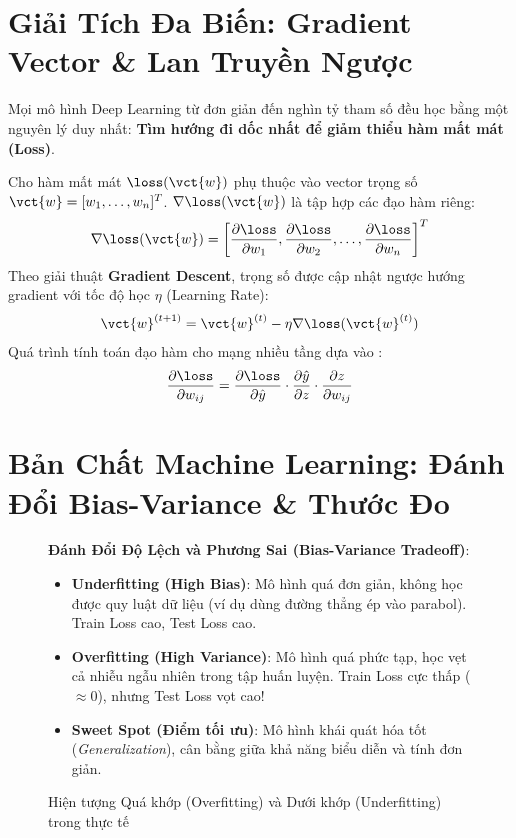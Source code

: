 \section{Giải Tích Đa Biến: Gradient Vector \& Lan Truyền Ngược}
\label{sec:math-calculus}

Mọi mô hình Deep Learning từ đơn giản đến nghìn tỷ tham số đều học bằng một nguyên lý duy nhất: \textbf{Tìm hướng đi dốc nhất để giảm thiểu hàm mất mát (Loss)}.

\begin{definitionbox}
Cho hàm mất mát $\loss(\vct{w})$ phụ thuộc vào vector trọng số $\vct{w} = [w_1, \dots, w_n]^T$.  $\nabla \loss(\vct{w})$ là tập hợp các đạo hàm riêng:
\[
\nabla \loss(\vct{w}) = \left[ \frac{\partial \loss}{\partial w_1}, \frac{\partial \loss}{\partial w_2}, \dots, \frac{\partial \loss}{\partial w_n} \right]^T
\]
Theo giải thuật \textbf{Gradient Descent}, trọng số được cập nhật ngược hướng gradient với tốc độ học $\eta$ (Learning Rate):
\[
\vct{w}^{(t+1)} = \vct{w}^{(t)} - \eta \nabla \loss(\vct{w}^{(t)})
\]
Quá trình tính toán đạo hàm cho mạng nhiều tầng dựa vào :
\[
\frac{\partial \loss}{\partial w_{ij}} = \frac{\partial \loss}{\partial \hat{y}} \cdot \frac{\partial \hat{y}}{\partial z} \cdot \frac{\partial z}{\partial w_{ij}}
\]
\end{definitionbox}

\section{Bản Chất Machine Learning: Đánh Đổi Bias-Variance \& Thước Đo}
\label{sec:ml-core}

\begin{figure}[htbp]
\centering
\begin{tcolorbox}[colback=boxbg,colframe=primarycolor,width=0.95\textwidth,arc=2pt]
\small
\textbf{Đánh Đổi Độ Lệch và Phương Sai (Bias-Variance Tradeoff)}:\\[0.2cm]
\begin{itemize}
  \item \textbf{Underfitting (High Bias)}: Mô hình quá đơn giản, không học được quy luật dữ liệu (ví dụ dùng đường thẳng ép vào parabol). Train Loss cao, Test Loss cao.
  \item \textbf{Overfitting (High Variance)}: Mô hình quá phức tạp, học vẹt cả nhiễu ngẫu nhiên trong tập huấn luyện. Train Loss cực thấp ($\approx 0$), nhưng Test Loss vọt cao!
  \item \textbf{Sweet Spot (Điểm tối ưu)}: Mô hình khái quát hóa tốt (\textit{Generalization}), cân bằng giữa khả năng biểu diễn và tính đơn giản.
\end{itemize}
\end{tcolorbox}
\caption{Hiện tượng Quá khớp (Overfitting) và Dưới khớp (Underfitting) trong thực tế}
\label{fig:bias-variance}
\end{figure}

